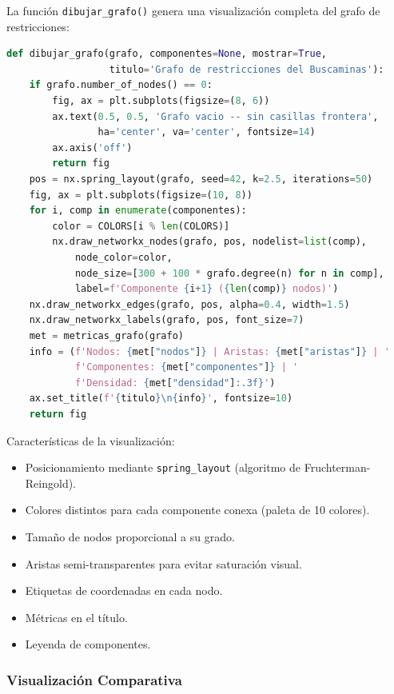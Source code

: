 \documentclass[12pt,a4paper]{article}
\begin{document}
La función \texttt{dibujar\_grafo()} genera una visualización completa del grafo de restricciones:

\begin{lstlisting}[language=Python, caption={Visualización del grafo de restricciones.}]
def dibujar_grafo(grafo, componentes=None, mostrar=True,
                  titulo='Grafo de restricciones del Buscaminas'):
    if grafo.number_of_nodes() == 0:
        fig, ax = plt.subplots(figsize=(8, 6))
        ax.text(0.5, 0.5, 'Grafo vacio -- sin casillas frontera',
                ha='center', va='center', fontsize=14)
        ax.axis('off')
        return fig
    pos = nx.spring_layout(grafo, seed=42, k=2.5, iterations=50)
    fig, ax = plt.subplots(figsize=(10, 8))
    for i, comp in enumerate(componentes):
        color = COLORS[i % len(COLORS)]
        nx.draw_networkx_nodes(grafo, pos, nodelist=list(comp),
            node_color=color,
            node_size=[300 + 100 * grafo.degree(n) for n in comp],
            label=f'Componente {i+1} ({len(comp)} nodos)')
    nx.draw_networkx_edges(grafo, pos, alpha=0.4, width=1.5)
    nx.draw_networkx_labels(grafo, pos, font_size=7)
    met = metricas_grafo(grafo)
    info = (f'Nodos: {met["nodos"]} | Aristas: {met["aristas"]} | '
            f'Componentes: {met["componentes"]} | '
            f'Densidad: {met["densidad"]:.3f}')
    ax.set_title(f'{titulo}\n{info}', fontsize=10)
    return fig
\end{lstlisting}

Características de la visualización:
\begin{itemize}[itemsep=2pt]
    \item Posicionamiento mediante \texttt{spring\_layout} (algoritmo de Fruchterman-Reingold).
    \item Colores distintos para cada componente conexa (paleta de 10 colores).
    \item Tamaño de nodos proporcional a su grado.
    \item Aristas semi-transparentes para evitar saturación visual.
    \item Etiquetas de coordenadas en cada nodo.
    \item Métricas en el título.
    \item Leyenda de componentes.
\end{itemize}

\subsubsection{Visualización Comparativa}
\end{document}
